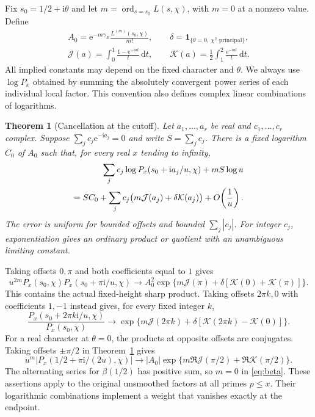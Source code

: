 \documentclass[11pt]{article}
\newtheorem{theorem}{Theorem}
\newcommand{\dd}{\,\mathrm d}
\newcommand{\e}{\mathrm e}
\newcommand{\ii}{\mathrm i}
\newcommand{\ord}{\operatorname{ord}}
\newcommand{\J}{\mathcal J}
\newcommand{\K}{\mathcal K}
\begin{document}
Fix $s_0=1/2+\ii\theta$ and let $m=\ord_{s=s_0} L(s,\chi)$, with $m=0$ at a nonzero value. Define
\begin{gather*}
 A_0=\e^{-m\gamma_E}\frac{L^{(m)}(s_0,\chi)}{m!},\qquad
 \delta=\mathbf1_{\{\theta=0,\ \chi^2\text{ principal}\}},\\
 \J(a)=\int_0^1\frac{1-\e^{-\ii at}}{t}\dd t,\qquad
 \K(a)=\frac12\int_1^2\frac{\e^{-\ii at}}{t}\dd t .
\end{gather*}
All implied constants may depend on the fixed character and $\theta$. We always use $\log P_x$ obtained by summing the absolutely convergent power series of each individual local factor. This convention also defines complex linear combinations of logarithms.

\begin{theorem}[Cancellation at the cutoff]\label{thm:pair}
Let $a_1,\ldots,a_r$ be real and $c_1,\ldots,c_r$ complex. Suppose
$\sum_j c_j\e^{-\ii a_j}=0$ and write $S=\sum_j c_j$.
There is a fixed logarithm $C_0$ of $A_0$ such that, for every real $x$ tending to infinity,
\begin{align}
 \sum_j c_j\log P_x(s_0+\ii a_j/u,\chi)+mS\log u
 \notag\\ = S C_0+\sum_j c_j\bigl(m\J(a_j)+\delta\K(a_j)\bigr)
     +O\!\left(\frac{1}{u}\right).\label{eq:lin}
\end{align}
The error is uniform for bounded offsets and bounded $\sum_j |c_j|$.
For integer $c_j$, exponentiation gives an ordinary product or quotient with an unambiguous limiting constant.
\end{theorem}

Taking offsets $0,\pi$ and both coefficients equal to $1$ gives
\begin{equation}\label{eq:two}
 u^{2m}P_x(s_0,\chi)P_x(s_0+\pi\ii/u,\chi)
 \longrightarrow A_0^2\exp\{m\J(\pi)+\delta[\K(0)+\K(\pi)]\}.
\end{equation}
This contains the actual fixed-height sharp product. Taking offsets $2\pi k,0$ with coefficients $1,-1$ instead gives, for every fixed integer $k$,
\[
 \frac{P_x(s_0+2\pi k\ii/u,\chi)}{P_x(s_0,\chi)}
 \longrightarrow \exp\{m\J(2\pi k)+\delta[\K(2\pi k)-\K(0)]\}.
\]
For a real character at $\theta=0$, the products at opposite offsets are conjugates. Taking offsets $\pm\pi/2$ in Theorem~\ref{thm:pair} gives
\[
 u^m|P_x(1/2+\pi\ii/(2u),\chi)|
 \longrightarrow |A_0|\exp\{m\Re\J(\pi/2)+\Re\K(\pi/2)\}.
\]
The alternating series for $\beta(1/2)$ has positive sum, so $m=0$ in \eqref{eq:beta}. These assertions apply to the original unsmoothed factors at all primes $p\le x$. Their logarithmic combinations implement a weight that vanishes exactly at the endpoint.
\end{document}
